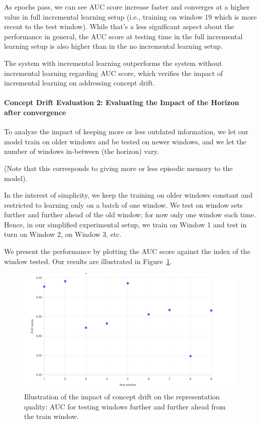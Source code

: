 As epochs pass, we can see AUC score increase faster and converges at a higher value in full incremental learning setup (i.e., training on window 19 which is more recent to the test window). While that's a less significant aspect about the performance in general, the AUC score at testing time in the full incremental learning setup is also higher than in the no incremental learning setup.


The system with incremental learning outperforms the system without incremental learning regarding AUC score, which verifies the impact of incremental learning on addressing concept drift.


\paragraph{Concept Drift Evaluation 2: Evaluating the Impact of the Horizon after convergence}

To analyze the impact of keeping more or less outdated information, we let our model train on older windows and be tested on newer windows, and we let the number of windows in-between (the horizon) vary.

(Note that this corresponds to giving more or less episodic memory to the model).

In the interest of simplicity, we keep the training on older windows constant and restricted to learning only on a batch of one window. We test on window sets further and further ahead of the old window; for now only one window each time.
% 
Hence, in our simplified experimental setup, we train on Window 1 and test in turn on Window 2, on Window 3, etc.

We present the performance by plotting the AUC score against the index of the window tested.
Our results are illustrated in Figure~\ref{fig:AUC_onFurther_windows}.

\begin{figure}[htbp!]
	\centering
	\includegraphics[width=0.6\linewidth]{images/plots/concept_drift_capture.png}
	\caption{Illustration of the impact of concept drift on the representation quality: AUC for testing windows further and further ahead from the train window.}
	\label{fig:AUC_onFurther_windows}
\end{figure}

